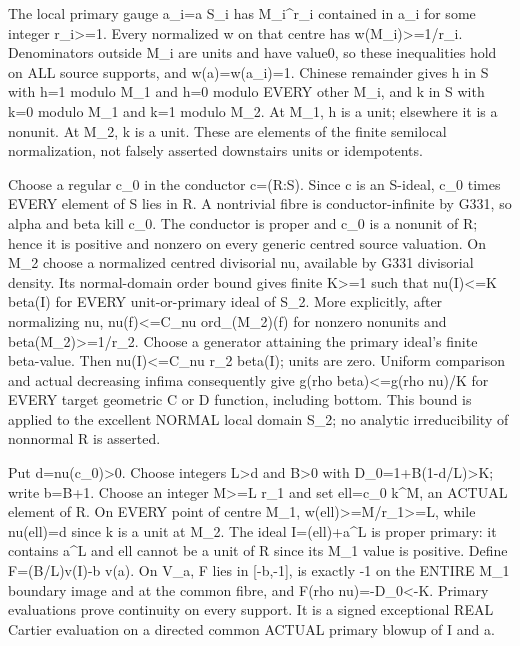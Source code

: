 \documentclass[11pt]{article}
\begin{document}
The local primary gauge a\_i=a S\_i has M\_i\textasciicircum{}r\_i contained in a\_i for some integer r\_i\textgreater{}=1. Every normalized w on that centre has w(M\_i)\textgreater{}=1/r\_i. Denominators outside M\_i are units and have value0, so these inequalities hold on ALL source supports, and w(a)=w(a\_i)=1. Chinese remainder gives h in S with h=1 modulo M\_1 and h=0 modulo EVERY other M\_i, and k in S with k=0 modulo M\_1 and k=1 modulo M\_2. At M\_1, h is a unit; elsewhere it is a nonunit. At M\_2, k is a unit. These are elements of the finite semilocal normalization, not falsely asserted downstairs units or idempotents.

Choose a regular c\_0 in the conductor c=(R:S). Since c is an S-ideal, c\_0 times EVERY element of S lies in R. A nontrivial fibre is conductor-infinite by G331, so alpha and beta kill c\_0. The conductor is proper and c\_0 is a nonunit of R; hence it is positive and nonzero on every generic centred source valuation. On M\_2 choose a normalized centred divisorial nu, available by G331 divisorial density. Its normal-domain order bound gives finite K\textgreater{}=1 such that nu(I)\textless{}=K beta(I) for EVERY unit-or-primary ideal of S\_2. More explicitly, after normalizing nu, nu(f)\textless{}=C\_nu ord\_(M\_2)(f) for nonzero nonunits and beta(M\_2)\textgreater{}=1/r\_2. Choose a generator attaining the primary ideal's finite beta-value. Then nu(I)\textless{}=C\_nu r\_2 beta(I); units are zero. Uniform comparison and actual decreasing infima consequently give g(rho beta)\textless{}=g(rho nu)/K for EVERY target geometric C or D function, including bottom. This bound is applied to the excellent NORMAL local domain S\_2; no analytic irreducibility of nonnormal R is asserted.

Put d=nu(c\_0)\textgreater{}0. Choose integers L\textgreater{}d and B\textgreater{}0 with D\_0=1+B(1-d/L)\textgreater{}K; write b=B+1. Choose an integer M\textgreater{}=L r\_1 and set ell=c\_0 k\textasciicircum{}M, an ACTUAL element of R. On EVERY point of centre M\_1, w(ell)\textgreater{}=M/r\_1\textgreater{}=L, while nu(ell)=d since k is a unit at M\_2. The ideal I=(ell)+a\textasciicircum{}L is proper primary: it contains a\textasciicircum{}L and ell cannot be a unit of R since its M\_1 value is positive. Define F=(B/L)v(I)-b v(a). On V\_a, F lies in [-b,-1], is exactly -1 on the ENTIRE M\_1 boundary image and at the common fibre, and F(rho nu)=-D\_0\textless{}-K. Primary evaluations prove continuity on every support. It is a signed exceptional REAL Cartier evaluation on a directed common ACTUAL primary blowup of I and a.
\end{document}
